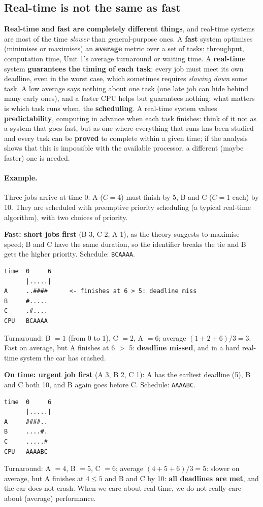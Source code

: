 \subsection{Real-time is not the same as fast}
\textbf{Real-time and fast are completely different things}, and real-time systems are most of the time \emph{slower} than general-purpose ones. A \textbf{fast} system optimises (minimises or maximises) an \textbf{average} metric over a set of tasks: throughput, computation time, Unit 1's average turnaround or waiting time. A \textbf{real-time} system \textbf{guarantees the timing of each task}: every job must meet its own deadline, even in the worst case, which sometimes requires \emph{slowing down} some task. A low average says nothing about one task (one late job can hide behind many early ones), and a faster CPU helps but guarantees nothing: what matters is which task runs when, the \textbf{scheduling}. A real-time system values \textbf{predictability}, computing in advance when each task finishes: think of it not as a system that goes fast, but as one where everything that runs has been studied and every task can be \textbf{proved} to complete within a given time; if the analysis shows that this is impossible with the available processor, a different (maybe faster) one is needed.

\paragraph{Example.} Three jobs arrive at time 0: A ($C = 4$) must finish by 5, B and C ($C = 1$ each) by 10. They are scheduled with preemptive priority scheduling (a typical real-time algorithm), with two choices of priority.

\textbf{Fast: short jobs first} (B 3, C 2, A 1), as the theory suggests to maximise speed; B and C have the same duration, so the identifier breaks the tie and B gets the higher priority. Schedule: \texttt{BCAAAA}.
\begin{verbatim}
time  0     6
      |.....|
A     ..####      <- finishes at 6 > 5: deadline miss
B     #.....
C     .#....
CPU   BCAAAA
\end{verbatim}
Turnaround: B $= 1$ (from 0 to 1), C $= 2$, A $= 6$; average $(1+2+6)/3 = 3$. Fast on average, but A finishes at 6 $>$ 5: \textbf{deadline missed}, and in a hard real-time system the car has crashed.

\textbf{On time: urgent job first} (A 3, B 2, C 1): A has the earliest deadline (5), B and C both 10, and B again goes before C. Schedule: \texttt{AAAABC}.
\begin{verbatim}
time  0     6
      |.....|
A     ####..
B     ....#.
C     .....#
CPU   AAAABC
\end{verbatim}
Turnaround: A $= 4$, B $= 5$, C $= 6$; average $(4+5+6)/3 = 5$: slower on average, but A finishes at $4 \le 5$ and B and C by 10: \textbf{all deadlines are met}, and the car does not crash. When we care about real time, we do not really care about (average) performance.

